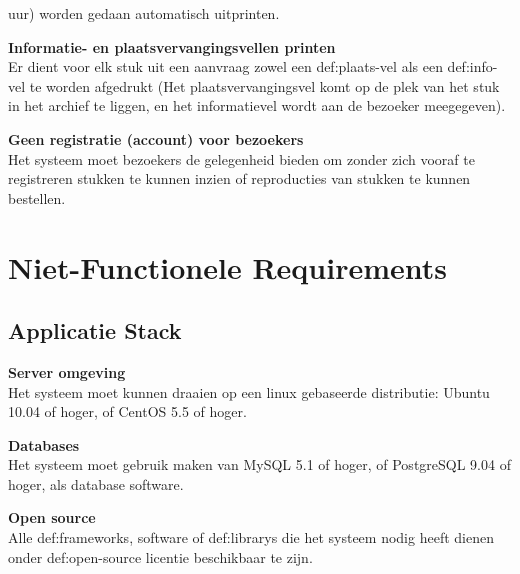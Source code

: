 \documentclass[a4paper,titlepage]{report}
\makeatletter
\def\nameddisplayedlabel#1#2{
  \label{#1}
  \begingroup
   \def\@currentlabel{#2}%
   \label{#1:name}\endgroup
   \textbf{#2}\hfill\\
}
\makeatother
\begin{document}
\begin{enumerate}[label={[F:\arabic*]},resume]
          uur) worden gedaan automatisch uitprinten.
          \begin{enumerate}[label={[F:\arabic{enumi}\alph*]}]
            \item\nameddisplayedlabel{f:print-vel}{Informatie- en
            plaatsvervangingsvellen printen}
              Er dient voor elk stuk uit een aanvraag zowel een
              \gls{def:plaats-vel} als een \gls{def:info-vel} te worden afgedrukt
              (Het plaatsvervangingsvel komt op de plek van het stuk in het
              archief te liggen, en het informatievel wordt aan de bezoeker
              meegegeven).
          \end{enumerate}
        \item\nameddisplayedlabel{f:geenregistratie}{Geen registratie (account) voor
          bezoekers}
          Het systeem moet bezoekers de gelegenheid bieden om zonder zich
          vooraf te registreren stukken te kunnen inzien of reproducties van
          stukken te kunnen bestellen.
      \end{enumerate}

  \section{Niet-Functionele Requirements}
    \subsection{Applicatie Stack}
      \begin{enumerate}[label={[NF:\arabic*]}]
        \item\nameddisplayedlabel{nf:server_omgeving}{Server omgeving}
          Het systeem moet kunnen draaien op een linux gebaseerde distributie:
          Ubuntu 10.04 of hoger, of CentOS 5.5 of hoger.
        \item\nameddisplayedlabel{nf:database}{Databases}
          Het systeem moet gebruik maken van MySQL 5.1 of hoger, of PostgreSQL
          9.04 of hoger, als database
          software.
        \item\nameddisplayedlabel{nf:open_source}{Open source}
          Alle \glspl{def:framework}, software of \glspl{def:library} die het systeem nodig heeft
          dienen onder \gls{def:open-source} licentie beschikbaar te zijn.
      \end{enumerate}
\end{document}
